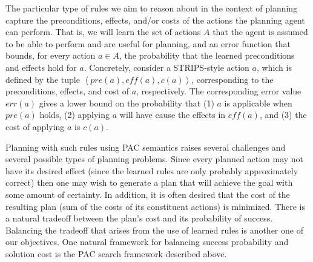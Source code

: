 \documentclass[12pt]{article}
\newcommand{\note}[1]{\textbf{\textit{#1}}}
\newcommand{\tuple}[1]{\ensuremath{\left \langle #1 \right \rangle }}
\newcommand{\eff}{\textit{eff}}
\newcommand{\pre}{\textit{pre}}
\begin{document}
The particular type of rules we aim to reason about in the context of planning capture the preconditions, effects, and/or costs of the actions the planning agent can perform. 
That is, we will learn the set of actions $A$ that the agent is assumed to be able to perform and are useful for planning, 
and an error function that bounds, for every action $a\in A$, 
the probability that the learned preconditions and effects hold for $a$.
Concretely, consider a STRIPS-style action $a$, which is defined by the tuple $\tuple{\pre(a), \eff(a), c(a)}$, corresponding to the preconditions, effects, and cost of $a$, respectively. The corresponding error value $err(a)$ gives a lower bound on the probability that (1) $a$ is applicable when $\pre(a)$ holds, (2) applying $a$ will have cause the effects in $\eff(a)$, and (3) the cost of applying $a$ is $c(a)$. 



Planning with such rules using PAC semantics raises several challenges and several possible types of planning problems.
Since every planned action may not have its desired effect (since the learned rules are only probably approximately correct)
then one may wish to generate a plan that will achieve the goal with some amount of certainty. In addition, it is often desired that the cost of the resulting plan (sum of the costs of its constituent actions) is minimized. There is a natural tradeoff between the plan's cost  and its probability of success. 
Balancing the tradeoff that arises from the use of learned rules is another one of our objectives. One natural framework for balancing success probability and solution cost is the PAC search framework described above. 
 

\end{document}
